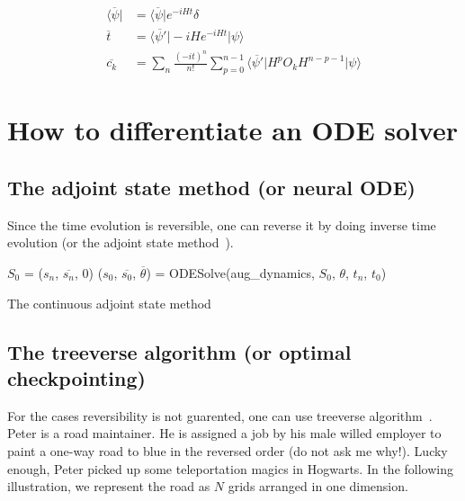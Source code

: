\documentclass{article}
\theoremstyle{definition}
\begin{document}
\begin{align}
    \overline{\langle\psi|} &= \overline{\langle\psi|}e^{-iHt}\delta\\
    \overline{t} &= \overline{\langle\psi'|}-iHe^{-iHt}|\psi\rangle\\
    \overline{c_k} &= \sum_n \frac{(-it)^n}{n!}\sum_{p=0}^{n-1} \overline{\langle\psi'|}H^p O_k H^{n-p-1}|\psi\rangle
\end{align}

\section{How to differentiate an ODE solver}
\subsection{The adjoint state method (or neural ODE)}
Since the time evolution is reversible, one can reverse it by doing inverse time evolution (or the adjoint state method~\cite{Plessix2006,Chen2018}).

\begin{algorithm}
    \SetAlgoLined
    \DontPrintSemicolon
        $S_0$ = ($s_n$, $\overline{s_n}$, $0$) 
        ($s_0$, $\overline{s_0}$, $\overline{\theta}$) = ODESolve(aug\_dynamics, $S_0$, $\theta$, $t_n$, $t_0$) 
    \caption{The continuous adjoint state method}\label{alg:adjointstate}
\end{algorithm}


\subsection{The treeverse algorithm (or optimal checkpointing)}

For the cases reversibility is not guarented, one can use treeverse algorithm~\cite{Griewank1992,TreeverseAlgorithm}.
Peter is a road maintainer.
He is assigned a job by his male willed employer to paint a one-way road to blue in the reversed order (do not ask me why!).
Lucky enough, Peter picked up some teleportation magics in Hogwarts.
In the following illustration, we represent the road as $N$ grids arranged in one dimension.
\end{document}
